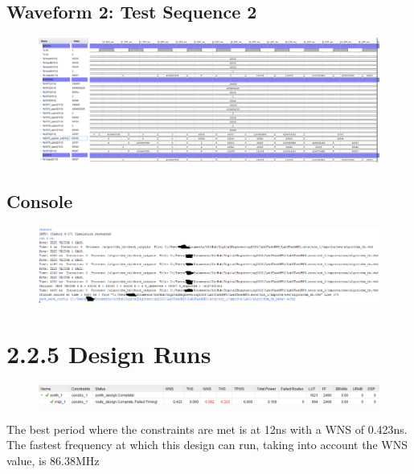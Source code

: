 \documentclass[11pt]{report}
\begin{document}
\subsection*{Waveform 2: Test Sequence 2}
\begin{figure}[H]
    \includegraphics[width=\columnwidth]{Reports/Lab3/Assets/2.2.4_waveform-test-sequence-2.png}
\end{figure}

\subsection*{Console}
\begin{figure}[H]
    \includegraphics[width=\columnwidth]{Reports/Lab3/Assets/2.2.4_console.png}
\end{figure}

\section*{2.2.5 Design Runs}
\begin{figure}[H]
    \includegraphics[width=\columnwidth]{Reports/Lab3/Assets/2.2.5_design-runs.png}
\end{figure}
The best period where the constraints are met is at 12ns with a WNS of 0.423ns. The fastest frequency at which this design can run, taking into account the WNS value,
is 86.38MHz
\end{document}
